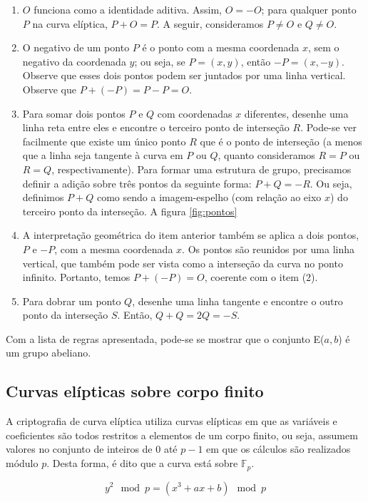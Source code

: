 \begin{enumerate}
  \item $O$ funciona como a identidade aditiva. Assim, $O = -O$; para qualquer ponto $P$ na curva elíptica, $P + O = P$. A seguir, consideramos $P \neq O$ e $Q \neq O$.
  \item O negativo de um ponto \(P\) é o ponto com a mesma coordenada \(x\), sem o negativo da coordenada \(y\); ou seja, se $P = (x, y)$, então $-P = (x, -y)$. Observe que esses dois pontos podem ser juntados por uma linha vertical. Observe que $P + (-P) = P - P = O$.
  \item Para somar dois pontos \(P\) e \(Q\) com coordenadas \(x\) diferentes, desenhe uma linha reta entre eles e encontre o terceiro ponto de interseção \(R\). Pode-se ver facilmente que existe um único ponto \(R\) que é o ponto de interseção (a menos que a linha seja tangente à curva em \(P\) ou \(Q\), quanto consideramos $R=P$ ou $R=Q$, respectivamente). Para formar uma estrutura de grupo, precisamos definir a adição sobre três pontos da seguinte forma: $P+Q=-R$. Ou seja, definimos $P+Q$ como sendo a imagem-espelho (com relação ao eixo \(x\)) do terceiro ponto da interseção. A figura \ref{fig:pontos}
  \item A interpretação geométrica do item anterior também se aplica a dois pontos, \(P\) e \(-P\), com a mesma coordenada \(x\). Os pontos são reunidos por uma linha vertical, que também pode ser vista como a interseção da curva no ponto infinito. Portanto, temos $P+(-P)=O$, coerente com o item (2).
  \item Para dobrar um ponto \(Q\), desenhe uma linha tangente e encontre o outro ponto da interseção \(S\). Então, $Q+Q=2Q=-S$.
\end{enumerate}

Com a lista de regras apresentada, pode-se se mostrar que o conjunto E(\(a, b\)) é um grupo abeliano. \cite{Stallings:2011}

\subsection{Curvas elípticas sobre corpo finito}
A criptografia de curva elíptica utiliza curvas elípticas em que as variáveis e coeficientes são todos restritos a elementos de um corpo finito, ou seja, assumem valores no conjunto de inteiros de 0 até $p - 1$ em que os cálculos são realizados módulo \(p\). Desta forma, é dito que a curva está sobre $\mathbb{F}_p$. \cite{Stallings:2011}

\begin{equation}
y^2 \mod p = (x^3 + ax + b) \mod p
\end{equation}

